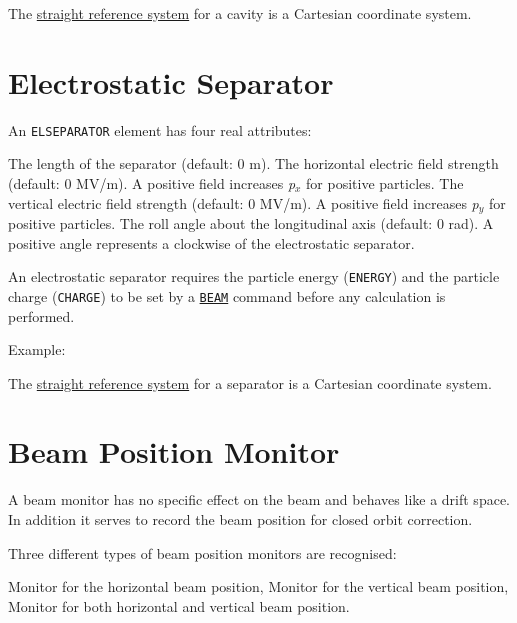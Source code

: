 The \hyperref[subsec:local-straight]{straight reference system} for a
cavity is a Cartesian coordinate system.  
 


\section{Electrostatic Separator}
\label{sec:separator}\label{sec:elseparator}


An \texttt{ELSEPARATOR} element has four real attributes: 
\begin{madlist}
    The length of the separator (default: 0 m). 
    The horizontal electric field strength (default: 0 MV/m). 
     A positive field increases \textit{p$_x$} for positive particles.  
    The vertical electric field strength (default: 0 MV/m). 
     A positive field increases \textit{p$_y$} for positive particles.  
    The roll angle about the longitudinal axis (default: 0
     rad). A positive angle represents a clockwise of the electrostatic
     separator.  
\end{madlist}

An electrostatic separator requires the particle energy
(\texttt{ENERGY}) and the particle charge
(\texttt{CHARGE}) to be set by a \hyperref[sec:beam]{\texttt{BEAM}}
command before any calculation is performed.  

Example: 

The \hyperref[subsec:local-straight]{straight reference system} for a
separator is a Cartesian coordinate system.   


\section{Beam Position Monitor}
\label{sec:monitor}

A beam monitor has no specific effect on the beam and behaves like a
drift space. 
In addition it serves to record the beam position for closed orbit
correction.

Three different types of beam position monitors are recognised:  
\begin{madlist}
    Monitor for the horizontal beam position, 
    Monitor for the vertical beam position, 
    Monitor for both horizontal and vertical beam position. 
\end{madlist}

